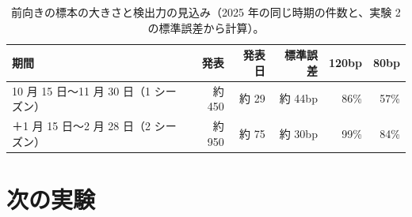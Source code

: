 \documentclass[xelatex,ja=standard,jafont=haranoaji,a4paper,10pt]{bxjsreport}
\begin{document}
\begin{table}[H]
\centering
\caption{前向きの標本の大きさと検出力の見込み（2025 年の同じ時期の件数と、実験 2 の標準誤差から計算）。}
\small
\begin{tabular}{lrrrrr}
\toprule
期間 & 発表 & 発表日 & 標準誤差 & 120bp & 80bp \\
\midrule
10 月 15 日〜11 月 30 日（1 シーズン） & 約 450 & 約 29 & 約 44bp & 86\% & 57\% \\
＋1 月 15 日〜2 月 28 日（2 シーズン） & 約 950 & 約 75 & 約 30bp & 99\% & 84\% \\
\bottomrule
\end{tabular}
\end{table}

\section{次の実験}
\end{document}
